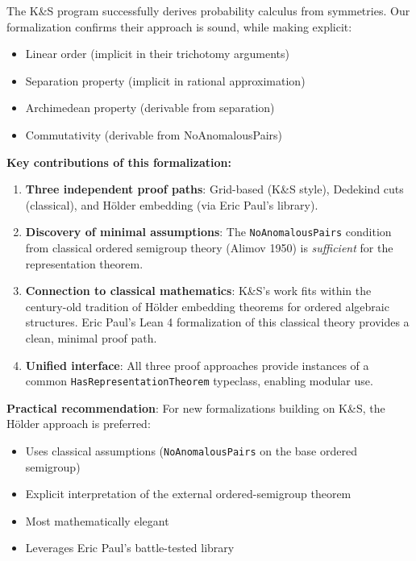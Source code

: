 \documentclass[11pt]{article}
\theoremstyle{definition}
\theoremstyle{remark}
\begin{document}
The K\&S program successfully derives probability calculus from symmetries.
Our formalization confirms their approach is sound, while making explicit:
\begin{itemize}
\item Linear order (implicit in their trichotomy arguments)
\item Separation property (implicit in rational approximation)
\item Archimedean property (derivable from separation)
\item Commutativity (derivable from NoAnomalousPairs)
\end{itemize}

\textbf{Key contributions of this formalization:}

\begin{enumerate}
\item \textbf{Three independent proof paths}: Grid-based (K\&S style), Dedekind cuts (classical), and H\"older embedding (via Eric Paul's library).

\item \textbf{Discovery of minimal assumptions}: The \texttt{NoAnomalousPairs} condition from classical ordered semigroup theory (Alimov 1950) is \emph{sufficient} for the representation theorem.

\item \textbf{Connection to classical mathematics}: K\&S's work fits within the century-old tradition of H\"older embedding theorems for ordered algebraic structures.
Eric Paul's Lean 4 formalization of this classical theory provides a clean, minimal proof path.

\item \textbf{Unified interface}: All three proof approaches provide instances of a common \texttt{HasRepresentationTheorem} typeclass, enabling modular use.
\end{enumerate}

\textbf{Practical recommendation}: For new formalizations building on K\&S, the H\"older approach is preferred:
\begin{itemize}
\item Uses classical assumptions (\texttt{NoAnomalousPairs} on the base ordered semigroup)
\item Explicit interpretation of the external ordered-semigroup theorem
\item Most mathematically elegant
\item Leverages Eric Paul's battle-tested library
\end{itemize}
\end{document}
